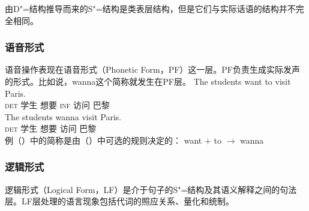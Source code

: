 由D"=结构推导而来的S"=结构是类表层结构，但是它们与实际话语的结构并不完全相同。

\subsubsection{语音形式}

语音操作表现在语音形式（Phonetic Form，PF）这一层。PF负责生成实际发声的形式。比如说，wanna这个简称就发生在PF层\citep[--21]{Chomsky81a}。
\eal
\ex 
\gll The students want to visit Paris.\\
\textsc{det} 学生 想要 \textsc{inf} 访问 巴黎\\
\ex 
\gll The students wanna visit Paris.\\
\textsc{det} 学生 想要 访问 巴黎\\
\zl
例（）中的简称是由（）中可选的规则决定的：
\ea
want $+$ to $\to$ wanna
\z
{}

\subsubsection{逻辑形式}

逻辑形式（Logical Form，LF）是介于句子的S"=结构及其语义解释之间的句法层。LF层处理的语言现象包括代词的照应关系、量化和统制。


